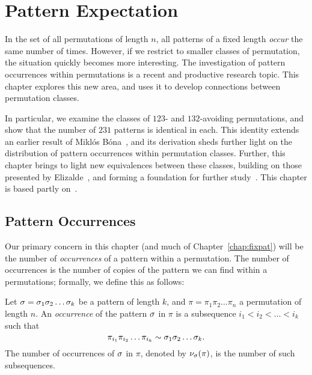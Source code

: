 \chapter{Pattern Expectation}
\label{chap:expat}
  

  
  In the set of all permutations of length $n$, all patterns of a fixed length 
  \emph{occur} the same number of times. However, if we restrict to smaller
  classes of permutation, the situation quickly becomes more interesting.  The
  investigation of pattern occurrences within permutations is a recent and
  productive research topic. This chapter explores this new area, and uses it
  to develop connections between permutation classes. 
  
  
  In particular, we examine the classes of $123$- and $132$-avoiding
  permutations, and show that the number of $231$ patterns is identical in each.
  This identity extends an earlier result of Mikl\'os B\'ona~\cite{Bona2012},
  and its derivation sheds further light on the distribution of pattern
  occurrences within permutation classes. Further, this chapter brings to light
  new equivalences between these classes, building on those presented by
  Elizalde~\cite{sergithesis}, and forming a foundation for
  further study~\cite{Elizalde2013, Rudolph2013, Janson2014}.  This chapter is
  based partly on~\cite{me-expat}.

  

  


\section{Pattern Occurrences}
\label{expat:occurrences}
  
  Our primary concern in this chapter (and much of Chapter~\ref{chap:fixpat})
  will be the number of \emph{occurrences} of a pattern within a permutation.
  The number of occurrences is the number of copies of the pattern we can
  find within a permutations; formally, we define this as follows: 
  
  \begin{definition} \label{def:occurrence} 
    Let $\sigma = \sigma_1 \sigma_2 \dots \sigma_k$ be a pattern of length $k$, and $\pi =
    \pi_1 \pi_2 \dots \pi_n$ a permutation of length $n$. An \emph{occurrence} of the
    pattern $\sigma$ in $\pi$ is a subsequence $i_1 < i_2 < \dots < i_k$ such
    that 
    $$ \pi_{i_1} \pi_{i_2} \dots \pi_{i_k} \sim \sigma_1 \sigma_2 \dots \sigma_k. $$ 
    The number of occurrences of $\sigma$ in $\pi$, denoted by $\nu_\sigma(\pi)$, is
    the number of such subsequences.  
  \end{definition}
    
